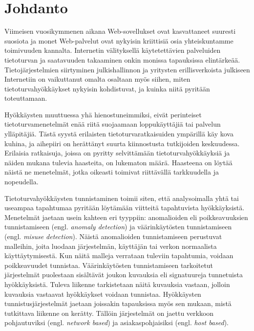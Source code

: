 
\chapter{Johdanto}

Viimeisen vuosikymmenen aikana Web-sovellukset ovat kasvattaneet suuresti suosiota ja monet Web-palvelut ovat nykyisin kriittisiä osia yhteiskuntamme toimivuuden kannalta. Internetin välityksellä käytetettävien palveluiden tietoturvan ja saatavuuden takaaminen onkin monissa tapauksissa elintärkeää. Tietojärjestelmien siirtyminen julkishallinnon ja yritysten erillisverkoista julkiseen Internetiin on vaikuttanut omalta osaltaan myös siihen, miten tietoturvahyökkäykset nykyisin kohdistuvat, ja kuinka niitä pyritään toteuttamaan.

Hyökkäysten muuttuessa yhä hienostuneimmiksi, 
eivät perinteiset tietoturvamenetelmät enää riitä suojaamaan loppukäyttäjiä tai palvelun ylläpitäjiä. Tästä syystä erilaisten tietoturvaratkaisuiden ympärillä käy kova kuhina, ja aihepiiri 
on herättänyt suurta kiinnostusta tutkijoiden keskuudessa. Erilaisia ratkaisuja, joissa on pyritty selvittämään tietoturvahyökkäyksiä ja näiden mukana tulevia haasteita, on lukematon määrä. 
Haasteena on löytää näistä ne menetelmät, jotka oikeasti toimivat riittävällä tarkkuudella ja nopeudella.  

Tietoturvahyökkäysten tunnistaminen toimii siten, että analysoimalla yhtä tai useampaa tapahtumaa pyritään löytämään viitteitä tapahtuvista hyökkäyksistä. Menetelmät jaetaan usein
kahteen eri tyyppiin: anomalioiden eli poikkeavuuksien tunnistamiseen (engl. \textit{anomaly detection}) ja väärinkäytösten tunnistamiseen (engl. \textit{misuse detection}). Näistä anomalioiden tunnistamiseen perustuvat malleihin, joita luodaan järjestelmän, käyttäjän tai verkon normaalista käyttäytymisestä. Kun näitä malleja verrataan tuleviin tapahtumia, voidaan poikkeavuudet tunnistaa. Väärinkäytösten 
tunnistamiseen tarkoitetut järjestelmät puolestaan sisältävät joukon kuvauksia eli signatuureja tunnetuista hyökkäyksistä. Tuleva liikenne tarkistetaan näitä kuvauksia vastaan, jolloin kuvauksia vastaavat
hyökkäykset voidaan tunnistaa. Hyökkäysten tunnistusjärjestelmät jaetaan joissakin tapauksissa myös sen mukaan, mistä tutkittava liikenne on kerätty. Tällöin järjestelmät on jaettu verkkoon pohjautuviksi (engl. \textit{network based})
ja asiakaspohjaisiksi (engl. \textit{host based}).

